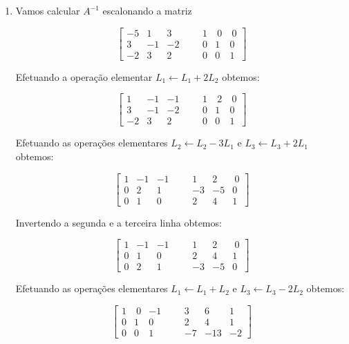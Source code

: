 \begin{solution}
\begin{enumerate}
\item[(a)] Vamos calcular $A^{-1}$ escalonando a matriz 

$$\left[ \begin{array}{rrrr|rrrr}
-5  &   1  &   3   & & &     1 &  \ 0 &  \ 0  \\
 3  &  -1  &  -2   & & &     0 &    1 &    0 \\
-2  &   3  &   2   & & &     0 &    0 &    1   
\end{array} \right]$$
 
Efetuando a operação elementar $L_1 \leftarrow L_1 + 2L_2$ obtemos:

$$\left[ \begin{array}{rrrr|rrrr}
 1  &  -1  &  -1   & & &     1 &  \ 2 &  \ 0  \\
 3  &  -1  &  -2   & & &     0 &    1 &    0 \\
-2  &   3  &   2   & & &     0 &    0 &    1   
\end{array} \right]$$

Efetuando as operações elementares $L_2 \leftarrow L_2 - 3L_1$  e  $L_3 \leftarrow L_3 + 2L_1$  obtemos:

$$\left[ \begin{array}{rrrr|rrrr}
 1  &  -1  &  -1   & & &     1 &    2 &  \ 0  \\
 0  &   2  &   1   & & &    -3 &   -5 &    0  \\
 0  &   1  &   0   & & &     2 &    4 &    1     
\end{array} \right]$$

Invertendo a segunda e a terceira linha obtemos:

$$\left[ \begin{array}{rrrr|rrrr}
 1  &  -1  &  -1   & & &     1 &    2 &  \ 0  \\
 0  &   1  &   0   & & &     2 &    4 &    1  \\  
 0  &   2  &   1   & & &    -3 &   -5 &    0
\end{array} \right]$$


Efetuando as operações elementares $L_1 \leftarrow L_1 + L_2$  e  $L_3 \leftarrow L_3 - 2L_2$  obtemos:
 
$$\left[ \begin{array}{rrrr|rrrr}
 1  & \ 0  &  -1   & & &     3 &    6 &    1  \\
 0  &   1  &   0   & & &     2 &    4 &    1  \\
 0  &   0  &   1   & & &    -7 &  -13 &   -2 
\end{array} \right]$$


\end{enumerate}
\end{solution}
